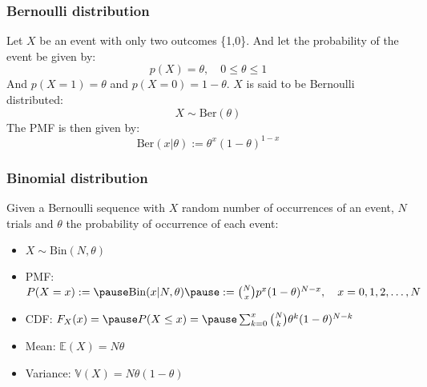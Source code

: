 \documentclass[usenames,dvipsnames,smaller]{beamer}
\newcommand{\?}{\stackrel{?}{=}}
\newcommand{\p}{\partial}
\begin{document}
\begin{frame}
  \frametitle{Bernoulli distribution}
  \pause
  Let $X$ be an event with only two outcomes \{1,0\}. \pause And let the probability of the event be given by:
  \pause
  \begin{equation*}
    p(X) = \theta, \quad 0\le\theta \le1
  \end{equation*}
  \pause
  And $p(X=1) = \theta$ and $p(X=0) = 1-\theta$.
  \pause
  $X$ is said to be Bernoulli distributed:
  \pause
  \begin{equation}
    X \sim \mathrm{Ber}(\theta)
  \end{equation}
  \pause
  The PMF is then given by: \pause
  \begin{equation}
  \mathrm{Ber}(x| \theta) := \theta^x(1 - \theta)^{1-x}
\end{equation}
\end{frame}
\begin{frame}
  \frametitle{Binomial distribution}
    \pause

  Given a Bernoulli sequence with $X$ random number of occurrences of an event, $N$ trials and $\theta$ the probability of occurrence of each event: \pause

  \begin{itemize}[<+->]
  \item  $X\sim \mathrm{Bin}(N, \theta)$ 
  \item    PMF: $ P(X = x) := \pause \mathrm{Bin}(x| N, \theta) \pause := {N \choose x}p^x (1-\theta)^{N-x}, \quad x = 0, 1, 2, \ldots, N$ 
  \item CDF:       $F_X(x) = \pause P(X \le x) = \pause  \sum_{k=0}^{x}{N \choose k}\theta^k (1-\theta)^{N-k}$ 
  \item    Mean: $\mathbb{E}(X) = N \theta$
  \item    Variance: $\mathbb{V}(X) = N \theta (1-\theta)$ 
  \end{itemize}
  \pause

  \begin{center}
  \end{center}
\end{frame}
\end{document}
